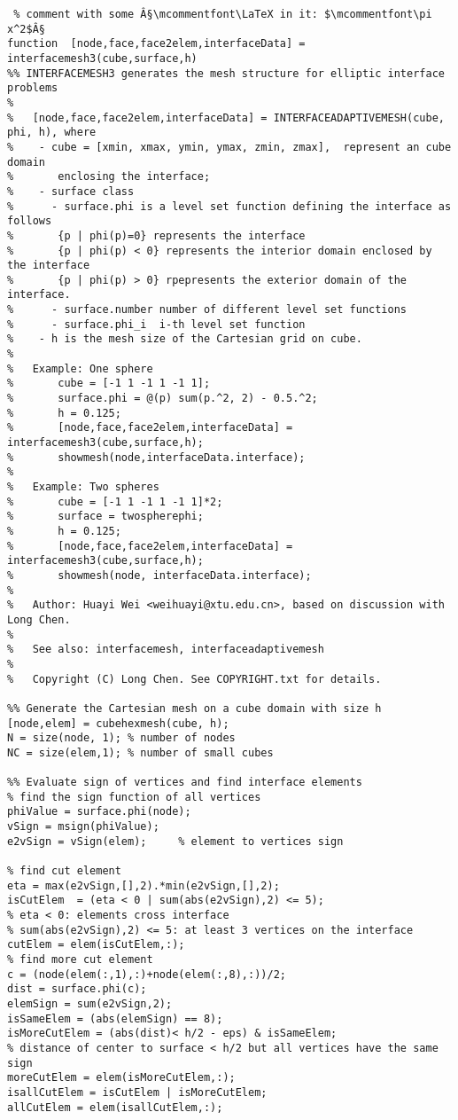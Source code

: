 \documentclass[12pt]{article}
\begin{document}
\begin{lstlisting}
 % comment with some Â§\mcommentfont\LaTeX in it: $\mcommentfont\pi x^2$Â§
function  [node,face,face2elem,interfaceData] = interfacemesh3(cube,surface,h)
%% INTERFACEMESH3 generates the mesh structure for elliptic interface problems
%
%   [node,face,face2elem,interfaceData] = INTERFACEADAPTIVEMESH(cube, phi, h), where 
%    - cube = [xmin, xmax, ymin, ymax, zmin, zmax],  represent an cube domain 
%       enclosing the interface; 
%    - surface class 
%      - surface.phi is a level set function defining the interface as follows
%       {p | phi(p)=0} represents the interface
%       {p | phi(p) < 0} represents the interior domain enclosed by the interface
%       {p | phi(p) > 0} rpepresents the exterior domain of the interface. 
%      - surface.number number of different level set functions 
%      - surface.phi_i  i-th level set function 
%    - h is the mesh size of the Cartesian grid on cube.
%
%   Example: One sphere
%       cube = [-1 1 -1 1 -1 1];
%       surface.phi = @(p) sum(p.^2, 2) - 0.5.^2;
%       h = 0.125;
%       [node,face,face2elem,interfaceData] = interfacemesh3(cube,surface,h);
%       showmesh(node,interfaceData.interface);
%
%   Example: Two spheres
%       cube = [-1 1 -1 1 -1 1]*2;
%       surface = twospherephi;
%       h = 0.125;
%       [node,face,face2elem,interfaceData] = interfacemesh3(cube,surface,h);
%       showmesh(node, interfaceData.interface);
%
%   Author: Huayi Wei <weihuayi@xtu.edu.cn>, based on discussion with Long Chen.
%
%   See also: interfacemesh, interfaceadaptivemesh
%
%   Copyright (C) Long Chen. See COPYRIGHT.txt for details. 

%% Generate the Cartesian mesh on a cube domain with size h
[node,elem] = cubehexmesh(cube, h);
N = size(node, 1); % number of nodes
NC = size(elem,1); % number of small cubes

%% Evaluate sign of vertices and find interface elements
% find the sign function of all vertices
phiValue = surface.phi(node);
vSign = msign(phiValue);
e2vSign = vSign(elem);     % element to vertices sign

% find cut element
eta = max(e2vSign,[],2).*min(e2vSign,[],2);
isCutElem  = (eta < 0 | sum(abs(e2vSign),2) <= 5); 
% eta < 0: elements cross interface
% sum(abs(e2vSign),2) <= 5: at least 3 vertices on the interface
cutElem = elem(isCutElem,:);
% find more cut element
c = (node(elem(:,1),:)+node(elem(:,8),:))/2;
dist = surface.phi(c);
elemSign = sum(e2vSign,2);
isSameElem = (abs(elemSign) == 8);
isMoreCutElem = (abs(dist)< h/2 - eps) & isSameElem;
% distance of center to surface < h/2 but all vertices have the same sign
moreCutElem = elem(isMoreCutElem,:);
isallCutElem = isCutElem | isMoreCutElem;
allCutElem = elem(isallCutElem,:);
 

\end{lstlisting}
\end{document}
